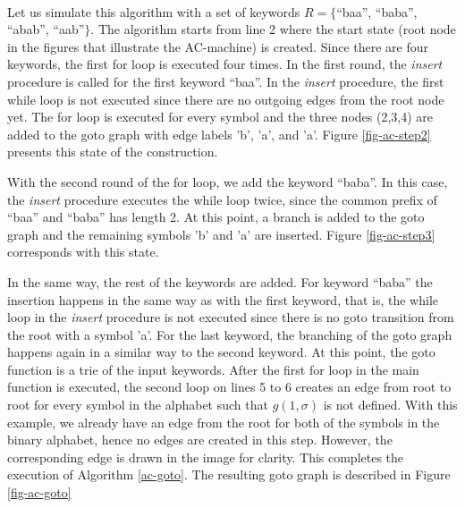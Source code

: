 \documentclass[english,twoside,censored,csm,algorithms-track-2020]{HYthesisML}
\theoremstyle{plain}
\theoremstyle{definition}
\begin{document}
  \begin{testexample}[]~\label{exmp-goto}\\
  Let us simulate this algorithm with a set of keywords $R=\{$``baa'', ``baba'', ``abab'', ``aab''$\}$.
  The algorithm starts from line 2 where the start state (root node in the figures that illustrate the AC-machine) is created.
  Since there are four keywords, the first for loop is executed four times.
  In the first round, the \textit{insert} procedure is called for the first keyword ``baa''.
  In the \textit{insert} procedure, the first while loop is not executed since there are no
  outgoing edges from the root node yet. The for loop is executed for every symbol and the three
  nodes (2,3,4) are added to the goto graph with edge labels 'b', 'a', and 'a'.
  Figure \ref{fig-ac-step2} presents this state of the construction.




  With the second round of the for loop, we add the keyword ``baba''. In this case, the \textit{insert}
  procedure executes the while loop twice, since the common prefix of ``baa'' and ``baba'' has length
  2. At this point, a branch is added to the goto graph
  and the remaining symbols 'b' and 'a' are inserted.
  Figure \ref{fig-ac-step3} corresponds with this state.



  In the same way, the rest of the keywords are added. For keyword ``baba'' the insertion
  happens in the same way as with the first keyword, that is, the while loop in the \textit{insert}
  procedure is not executed since there is no goto transition from the root with a symbol 'a'.
  For the last keyword, the branching of the goto graph happens again
  in a similar way to the second keyword. At this point, the goto function is a trie of the
  input keywords. After the first for loop in the main function is executed,
  the second loop on lines 5 to 6 creates an edge from root to root for every symbol in the
  alphabet such that $g(1,\sigma)$ is not defined. With this example, we already have an edge from the
  root for both of the symbols in the binary alphabet, hence no edges are created in this step.
  However, the corresponding edge is drawn in the image for clarity. This completes the execution of
  Algorithm \ref{ac-goto}.
  The resulting goto graph is described in Figure \ref{fig-ac-goto}

  \end{testexample}
\end{document}
